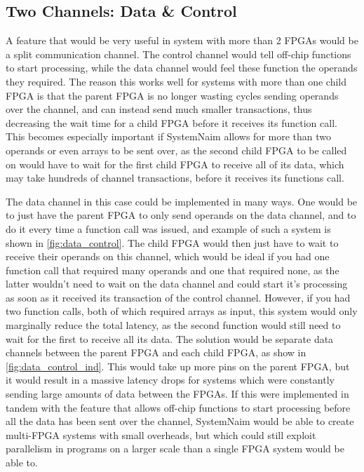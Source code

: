 \subsection{Two Channels: Data \& Control}

A feature that would be very useful in system with more than 2 FPGAs would be a split communication channel. The control channel would tell off-chip functions to start processing, while the data channel would feel these function the operands they required. The reason this works well for systems with more than one child FPGA is that the parent FPGA is no longer wasting cycles sending operands over the channel, and can instead send much smaller transactions, thus decreasing the wait time for a child FPGA before it receives its function call. This becomes especially important if SystemNaim allows for more than two operands or even arrays to be sent over, as the second child FPGA to be called on would have to wait for the first child FPGA to receive all of its data, which may take hundreds of channel transactions, before it receives its functions call. 

The data channel in this case could be implemented in many ways. One would be to just have the parent FPGA to only send operands on the data channel, and to do it every time a function call was issued, and example of such a system is shown in \autoref{fig:data_control}. The child FPGA would then just have to wait to receive their operands on this channel, which would be ideal if you had one function call that required many operands and one that required none, as the latter wouldn't need to wait on the data channel and could start it's processing as soon as it received its transaction of the control channel. However, if you had two function calls, both of which required arrays as input, this system would only marginally reduce the total latency, as the second function would still need to wait for the first to receive all its data. The solution would be separate data channels between the parent FPGA and each child FPGA, as show in \autoref{fig:data_control_ind}. This would take up more pins on the parent FPGA, but it would result in a massive latency drops for systems which were constantly sending large amounts of data between the FPGAs. If this were implemented in tandem with the feature that allows off-chip functions to start processing before all the data has been sent over the channel, SystemNaim would be able to create multi-FPGA systems with small overheads, but which could still exploit parallelism in programs on a larger scale than a single FPGA system would be able to.

